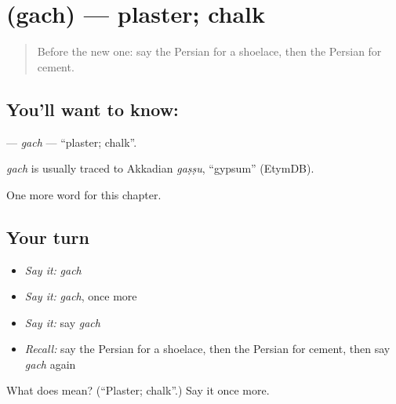 \section[\texorpdfstring{\fa{گچ} (gach)}{گچ (gach)}]{ (gach) — plaster; chalk}

\label{lesson:FA-C248-gach}



\begin{quote}
Before the new one: say the Persian for a shoelace, then the Persian for cement.
\end{quote}

\subsection*{You'll want to know: }
\textbf{} — \emph{gach} — \textquotedblleft{}plaster; chalk\textquotedblright{}.

\begin{cousinweb}
\emph{gach} is usually traced to Akkadian \emph{gaṣṣu}, \textquotedblleft{}gypsum\textquotedblright{} (EtymDB).
\end{cousinweb}

\begin{grammarlens}[title={What you've built}]
One more word for this chapter.
\end{grammarlens}

\subsection*{Your turn}
\begin{itemize}
\raggedright
  \item \emph{Say it:} \emph{gach}
  \item \emph{Say it:} \emph{gach}, once more
  \item \emph{Say it:} say \emph{gach}
  \item \emph{Recall:} say the Persian for a shoelace, then the Persian for cement, then say \emph{gach} again
\end{itemize}

\begin{tcolorbox}[breakable,colback=teal!4,colframe=teal!35!black,title={Before you move on}]
What does  mean? (\textquotedblleft{}Plaster; chalk\textquotedblright{}.) Say it once more.
\end{tcolorbox}
